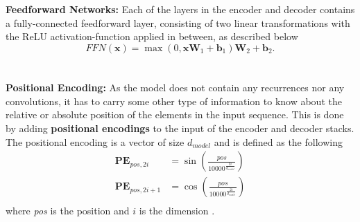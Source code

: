 \documentclass[./main.tex]{subfiles}
\begin{document}
\\
\\
\noindent \textbf{Feedforward Networks:} Each of the layers in the encoder and decoder contains a fully-connected feedforward layer, consisting of two linear transformations with the ReLU activation-function applied in between, as described below \cite{https://doi.org/10.48550/arxiv.1706.03762}
\begin{equation}
    FFN(\bm{x}) = \max \left(0, \bm{x} \bm{W}_1 + \bm{b}_1 \right) \bm{W}_2 + \bm{b}_2.
\end{equation}
\\
\\
\noindent \textbf{Positional Encoding:} As the model does not contain any recurrences nor any convolutions, it has to carry some other type of information to know about the relative or absolute position of the elements in the input sequence. This is done by adding \textbf{positional encodings} to the input of the encoder and decoder stacks. The positional encoding is a vector of size $d_{model}$ and is defined as the following
\begin{align}
    \bm{PE}_{pos, 2i} &= \sin \left( \frac{pos}{10000^{\frac{2i}{d_{model}}}} \right) \\
    \bm{PE}_{pos, 2i + 1} &= \cos \left( \frac{pos}{10000^{\frac{2i}{d_{model}}}} \right) \\
\end{align}
where \textit{pos} is the position and $i$ is the dimension \cite{https://doi.org/10.48550/arxiv.1706.03762}.
\end{document}
